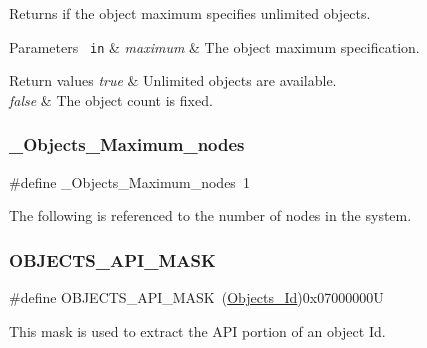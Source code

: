 Returns if the object maximum specifies unlimited objects.


\begin{DoxyParams}[1]{Parameters}
\mbox{\texttt{ in}}  & {\em maximum} & The object maximum specification.\\
\hline
\end{DoxyParams}

\begin{DoxyRetVals}{Return values}
{\em true} & Unlimited objects are available. \\
\hline
{\em false} & The object count is fixed. \\
\hline
\end{DoxyRetVals}
\mbox{\label{group__RTEMSScoreObject_ga926f1a08ed4b3780f90798a0f9d750af}} 
\subsubsection{\texorpdfstring{\_Objects\_Maximum\_nodes}{\_Objects\_Maximum\_nodes}}
{\footnotesize\ttfamily \#define \+\_\+\+Objects\+\_\+\+Maximum\+\_\+nodes~1}

The following is referenced to the number of nodes in the system. \mbox{\label{group__RTEMSScoreObject_gaf5e445d4968ba98eb7251e1ed35ad999}} 
\subsubsection{\texorpdfstring{OBJECTS\_API\_MASK}{OBJECTS\_API\_MASK}}
{\footnotesize\ttfamily \#define O\+B\+J\+E\+C\+T\+S\+\_\+\+A\+P\+I\+\_\+\+M\+A\+SK~(\mbox{\hyperlink{group__RTEMSScoreObject_ga5821f52a51072941bdd603e542d0863e}{Objects\+\_\+\+Id}})0x07000000U}

This mask is used to extract the A\+PI portion of an object Id. \mbox{\label{group__RTEMSScoreObject_ga89016b0e4f07ca038969994019aed978}} 
